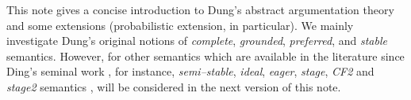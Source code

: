 This note gives a concise introduction to Dung's abstract argumentation theory \cite{Dun1995} and  some extensions (probabilistic extension, in particular).
% 
We mainly investigate Dung's original notions of \textit{complete}, \textit{grounded}, \textit{preferred}, and \textit{stable} semantics. 
However, 
for other semantics which are available in the literature since Ding's seminal work \cite{Dun1995}, 
for instance, 
\textit{semi--stable}, \textit{ideal}, \textit{eager}, \textit{stage}, \textit{CF2} and \textit{stage2} semantics \cite{Bar.Gia2009, Bar.Cam.Gia2018}, 
will be considered in the next version of this note.






\tableofcontents